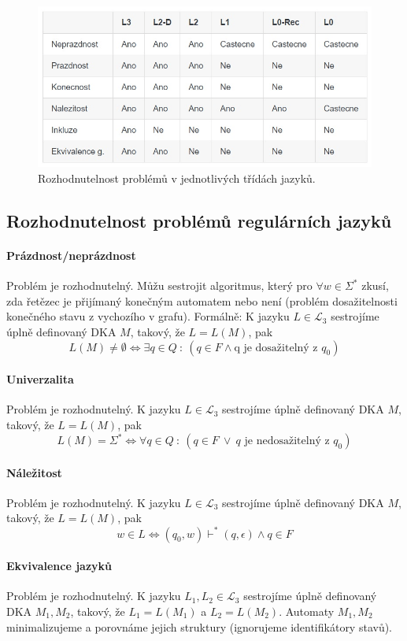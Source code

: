 \begin{figure}[H]
    \centering
    \includegraphics[width=1\linewidth]{rozhodnutelnost_jazyku.png}
    \caption{Rozhodnutelnost problémů v jednotlivých třídách jazyků.}
\end{figure}

\subsection{Rozhodnutelnost problémů regulárních jazyků}

\paragraph*{Prázdnost/neprázdnost} Problém je rozhodnutelný. Můžu sestrojit algoritmus, který pro $\forall w \in \Sigma^*$ zkusí, zda řetězec je přijímaný konečným automatem nebo není (problém dosažitelnosti konečného stavu z vychozího v grafu). Formálně: K jazyku $L \in \mathcal{L}_3$ sestrojíme úplně definovaný DKA $M$, takový, že $L = L(M)$, pak $$ L(M) \not= \emptyset \Leftrightarrow \exists q \in Q ~:~ (q \in F \land \text{q je dosažitelný z } q_0)$$

\paragraph*{Univerzalita} Problém je rozhodnutelný. K jazyku $L \in \mathcal{L}_3$ sestrojíme úplně definovaný DKA $M$, takový, že $L = L(M)$, pak $$ L(M) = \Sigma^* \Leftrightarrow \forall q \in Q ~:~ (q \in F ~\lor~ q \text{ je nedosažitelný z } q_0 )$$

\paragraph*{Náležitost} Problém je rozhodnutelný. K jazyku $L \in \mathcal{L}_3$ sestrojíme úplně definovaný DKA $M$, takový, že $L = L(M)$, pak $$ w \in L \Leftrightarrow (q_0, w) \vdash^* (q, \epsilon) \land q \in F $$

\paragraph*{Ekvivalence jazyků} Problém je rozhodnutelný. K jazyku $L_1, L_2 \in \mathcal{L}_3$ sestrojíme úplně definovaný DKA $M_1, M_2$, takový, že $L_1 = L(M_1)$ a $L_2 = L(M_2)$. Automaty $M_1, M_2$ minimalizujeme a porovnáme jejich struktury (ignorujeme identifikátory stavů).

